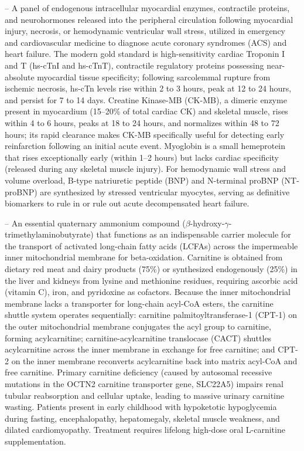 -- A panel of endogenous intracellular myocardial enzymes, contractile proteins, and neurohormones released into the peripheral circulation following myocardial injury, necrosis, or hemodynamic ventricular wall stress, utilized in emergency and cardiovascular medicine to diagnose acute coronary syndromes (ACS) and heart failure. The modern gold standard is high-sensitivity cardiac Troponin I and T (hs-cTnI and hs-cTnT), contractile regulatory proteins possessing near-absolute myocardial tissue specificity; following sarcolemmal rupture from ischemic necrosis, hs-cTn levels rise within 2 to 3 hours, peak at 12 to 24 hours, and persist for 7 to 14 days. Creatine Kinase-MB (CK-MB), a dimeric enzyme present in myocardium (15--20\% of total cardiac CK) and skeletal muscle, rises within 4 to 6 hours, peaks at 18 to 24 hours, and normalizes within 48 to 72 hours; its rapid clearance makes CK-MB specifically useful for detecting early reinfarction following an initial acute event. Myoglobin is a small hemeprotein that rises exceptionally early (within 1--2 hours) but lacks cardiac specificity (released during any skeletal muscle injury). For hemodynamic wall stress and volume overload, B-type natriuretic peptide (BNP) and N-terminal proBNP (NT-proBNP) are synthesized by stressed ventricular myocytes, serving as definitive biomarkers to rule in or rule out acute decompensated heart failure.

-- An essential quaternary ammonium compound ($\beta$-hydroxy-$\gamma$-trimethylaminobutyrate) that functions as an indispensable carrier molecule for the transport of activated long-chain fatty acids (LCFAs) across the impermeable inner mitochondrial membrane for beta-oxidation. Carnitine is obtained from dietary red meat and dairy products (75\%) or synthesized endogenously (25\%) in the liver and kidneys from lysine and methionine residues, requiring ascorbic acid (vitamin C), iron, and pyridoxine as cofactors. Because the inner mitochondrial membrane lacks a transporter for long-chain acyl-CoA esters, the carnitine shuttle system operates sequentially: carnitine palmitoyltransferase-1 (CPT-1) on the outer mitochondrial membrane conjugates the acyl group to carnitine, forming acylcarnitine; carnitine-acylcarnitine translocase (CACT) shuttles acylcarnitine across the inner membrane in exchange for free carnitine; and CPT-2 on the inner membrane reconverts acylcarnitine back into matrix acyl-CoA and free carnitine. Primary carnitine deficiency (caused by autosomal recessive mutations in the OCTN2 carnitine transporter gene, SLC22A5) impairs renal tubular reabsorption and cellular uptake, leading to massive urinary carnitine wasting. Patients present in early childhood with hypoketotic hypoglycemia during fasting, encephalopathy, hepatomegaly, skeletal muscle weakness, and dilated cardiomyopathy. Treatment requires lifelong high-dose oral L-carnitine supplementation.

